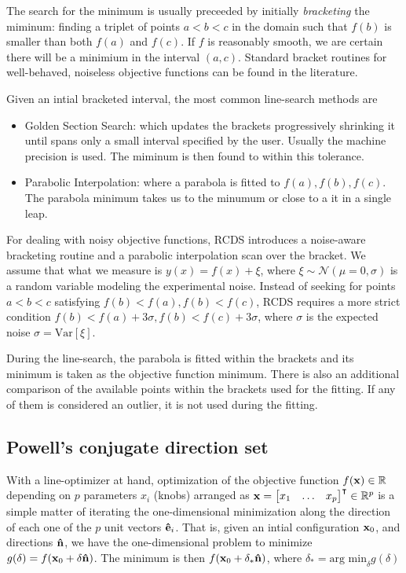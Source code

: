 The search for the minimum is usually preceeded by initially \textit{bracketing} the miminum: finding a triplet of points $a<b<c$ in the domain such that $f(b)$ is smaller than both $f(a)$ and $f(c)$. If $f$ is reasonably smooth, we are certain there will be a minimium in the interval $(a, c)$. Standard bracket routines for well-behaved, noiseless objective functions can be found in the literature.

Given an intial bracketed interval, the most common line-search methods are
\begin{itemize}
    \item Golden Section Search: which updates the brackets progressively shrinking it until spans only a small interval specified by the user. Usually the machine precision is used. The miminum is then found to within this tolerance.
    \item Parabolic Interpolation: where a parabola is fitted to $f(a), f(b), f(c)$. The parabola minimum takes us to the minumum or close to a it in a single leap.
\end{itemize}
For dealing with noisy objective functions, RCDS introduces a noise-aware bracketing routine and a parabolic interpolation scan over the bracket. We assume that what we measure is $y(x)=f(x) + \xi$, where $\xi\sim\mathcal{N}(\mu=0, \sigma)$ is a random variable modeling the experimental noise. Instead of seeking for points $a<b<c$ satisfying $f(b)< f(a), f(b) < f(c)$, RCDS requires a more strict condition $f(b)< f(a)+3\sigma, f(b) < f(c)+3\sigma$, where $\sigma$ is the expected noise $\sigma = \text{Var}[\xi]$.

During the line-search, the parabola is fitted within the brackets and its minimum is taken as the objective function minimum. There is also an additional comparison of the available points within the brackets used for the fitting. If any of them is considered an outlier, it is not used during the fitting.
\subsection{Powell's conjugate direction set}
With a line-optimizer at hand, optimization of the objective function $f(\vb{x})\in\mathbb{R}$ depending on $p$ parameters $x_i$ (knobs) arranged as $\vb{x} = \mqty[x_1 & \dots & x_p]^\intercal \in \mathbb{R}^p$ is a simple matter of iterating the one-dimensional minimization along the direction of each one of the $p$ unit vectors $\vu{e}_i$. That is, given an intial configuration $\vb{x}_0$, and directions $\vu{n}$, we have the one-dimensional problem to minimize $g(\delta)=f(\vb{x}_0 + \delta \vu{n})$. The minimum is  then $f(\vb{x}_0 + \delta_* \vu{n})$, where $\delta_* = \text{arg min}_\delta g(\delta)$

